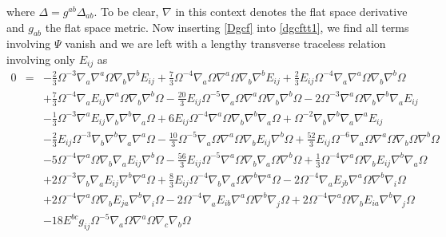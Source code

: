 \documentclass[10pt,letterpaper]{article}
\numberwithin{equation}{section}
\begin{document}
where $\Delta = g^{ab}\Delta_{ab}$. To be clear, $\nabla$ in this context denotes the flat space derivative and $g_{ab}$ the flat space metric. Now inserting \eqref{Dgcf} into \eqref{dgcftt1}, we find all terms involving $\Psi$ vanish and we are left with a lengthy transverse traceless relation involving only $E_{ij}$ as
%
%
\begin{eqnarray}
0&=&- \tfrac{2}{3} \Omega^{-3} \nabla_{a}\nabla^{a}\Omega \nabla_{b}\nabla^{b}E_{ij}
+ \tfrac{7}{3} \Omega^{-4} \nabla_{a}\Omega \nabla^{a}\Omega \nabla_{b}\nabla^{b}E_{ij}
+ \tfrac{2}{3} E_{ij} \Omega^{-4} \nabla_{a}\nabla^{a}\Omega \nabla_{b}\nabla^{b}\Omega\nonumber\\
&& + \tfrac{7}{3} \Omega^{-4} \nabla_{a}E_{ij} \nabla^{a}\Omega \nabla_{b}\nabla^{b}\Omega
-  \tfrac{20}{3} E_{ij} \Omega^{-5} \nabla_{a}\Omega \nabla^{a}\Omega \nabla_{b}\nabla^{b}\Omega
- 2 \Omega^{-3} \nabla^{a}\Omega \nabla_{b}\nabla^{b}\nabla_{a}E_{ij}\nonumber\\
&& -  \tfrac{1}{3} \Omega^{-3} \nabla^{a}E_{ij} \nabla_{b}\nabla^{b}\nabla_{a}\Omega
+ 6 E_{ij} \Omega^{-4} \nabla^{a}\Omega \nabla_{b}\nabla^{b}\nabla_{a}\Omega
+ \Omega^{-2} \nabla_{b}\nabla^{b}\nabla_{a}\nabla^{a}E_{ij}\nonumber\\
&& -  \tfrac{2}{3} E_{ij} \Omega^{-3} \nabla_{b}\nabla^{b}\nabla_{a}\nabla^{a}\Omega
-  \tfrac{10}{3} \Omega^{-5} \nabla_{a}\Omega \nabla^{a}\Omega \nabla_{b}E_{ij} \nabla^{b}\Omega
+ \tfrac{52}{3} E_{ij} \Omega^{-6} \nabla_{a}\Omega \nabla^{a}\Omega \nabla_{b}\Omega \nabla^{b}\Omega\nonumber\\
&& - 5 \Omega^{-4} \nabla^{a}\Omega \nabla_{b}\nabla_{a}E_{ij} \nabla^{b}\Omega
-  \tfrac{56}{3} E_{ij} \Omega^{-5} \nabla^{a}\Omega \nabla_{b}\nabla_{a}\Omega \nabla^{b}\Omega
+ \tfrac{1}{3} \Omega^{-4} \nabla^{a}\Omega \nabla_{b}E_{ij} \nabla^{b}\nabla_{a}\Omega\nonumber\\
&& + 2 \Omega^{-3} \nabla_{b}\nabla_{a}E_{ij} \nabla^{b}\nabla^{a}\Omega
+ \tfrac{8}{3} E_{ij} \Omega^{-4} \nabla_{b}\nabla_{a}\Omega \nabla^{b}\nabla^{a}\Omega
- 2 \Omega^{-4} \nabla_{a}E_{jb} \nabla^{a}\Omega \nabla^{b}\nabla_{i}\Omega\nonumber\\
&& + 2 \Omega^{-4} \nabla^{a}\Omega \nabla_{b}E_{ja} \nabla^{b}\nabla_{i}\Omega
- 2 \Omega^{-4} \nabla_{a}E_{ib} \nabla^{a}\Omega \nabla^{b}\nabla_{j}\Omega
+ 2 \Omega^{-4} \nabla^{a}\Omega \nabla_{b}E_{ia} \nabla^{b}\nabla_{j}\Omega\nonumber\\
&& - 18 E^{bc} g_{ij} \Omega^{-5} \nabla_{a}\Omega \nabla^{a}\Omega \nabla_{c}\nabla_{b}\Omega

\end{eqnarray}
\end{document}
